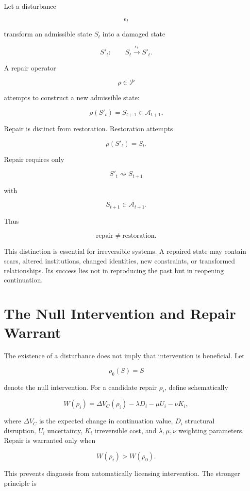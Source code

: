\documentclass[11pt,oneside]{book}
\theoremstyle{definition}
\theoremstyle{remark}
\begin{document}
Let a disturbance

\[
\epsilon_t
\]

transform an admissible state \(S_t\) into a damaged state

\[
S'_t: \qquad S_t\xrightarrow{\epsilon_t}S'_t.
\]

A repair operator

\[
\rho\in\mathcal{P}
\]

attempts to construct a new admissible state:

\[
\rho(S'_t)=S_{t+1}\in\mathcal{A}_{t+1}.
\]

Repair is distinct from restoration. Restoration attempts

\[
\rho(S'_t)=S_t.
\]

Repair requires only

\[
S'_t\rightsquigarrow S_{t+1}
\]

with

\[
S_{t+1}\in\mathcal{A}_{t+1}.
\]

Thus

\[
\boxed{ \text{repair}\neq\text{restoration}. }
\]

This distinction is essential for irreversible systems. A repaired state may contain scars, altered
institutions, changed identities, new constraints, or transformed relationships. Its success lies
not in reproducing the past but in reopening continuation.

\section{The Null Intervention and Repair Warrant}

The existence of a disturbance does not imply that intervention is beneficial. Let

\[
\rho_0(S)=S
\]

denote the null intervention. For a candidate repair \(\rho_i\), define schematically

\[
W(\rho_i) = \Delta V_C(\rho_i) - \lambda D_i - \mu U_i - \nu K_i,
\]

where \(\Delta V_C\) is the expected change in continuation value, \(D_i\) structural disruption,
\(U_i\) uncertainty, \(K_i\) irreversible cost, and \(\lambda,\mu,\nu\) weighting parameters. Repair
is warranted only when

\[
W(\rho_i)>W(\rho_0).
\]

This prevents diagnosis from automatically licensing intervention. The stronger principle is
\end{document}
